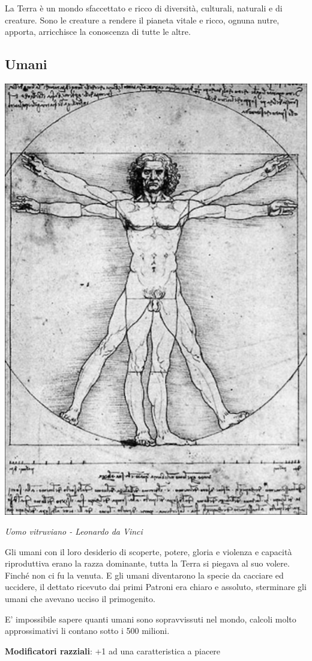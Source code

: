 \begin{multicols}{2}

La Terra è un mondo sfaccettato e ricco di diversità, culturali, naturali e di creature.
Sono le creature a rendere il pianeta vitale e ricco, ognuna nutre, apporta, arricchisce la conoscenza di tutte le altre.

\subsection{Umani}\label{umani}

\begin{center}
\includegraphics[height=0.9\linewidth]{immagini/uomovitruviano2.png}

\emph{Uomo vitruviano - Leonardo da Vinci}
\end{center}

Gli umani con il loro desiderio di scoperte, potere, gloria e violenza e capacità riproduttiva erano la razza dominante, tutta la Terra si piegava al suo volere. Finché non ci fu la venuta.
E gli umani diventarono la specie da cacciare ed uccidere, il dettato ricevuto dai primi Patroni era chiaro e assoluto, sterminare gli umani che avevano ucciso il primogenito.

E' impossibile sapere quanti umani sono sopravvissuti nel mondo, calcoli molto approssimativi li contano sotto i 500 milioni.

\textbf{Modificatori razziali}: +1 ad una caratteristica a piacere


\end{multicols}
